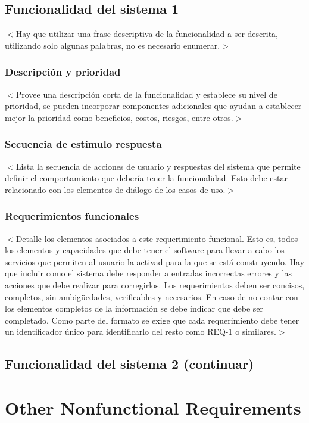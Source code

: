 \documentclass{scrreprt}
\begin{document}
\section{Funcionalidad del sistema 1}
$<$Hay que utilizar una frase descriptiva de la funcionalidad a ser descrita, utilizando solo algunas palabras, no es necesario enumerar.$>$

\subsection{Descripción y prioridad}
$<$Provee una descripción corta de la funcionalidad y establece su nivel de prioridad, se pueden incorporar componentes adicionales que ayudan a establecer mejor la prioridad como beneficios, costos, riesgos, entre otros.$>$

\subsection{Secuencia de estimulo respuesta}
$<$Lista la secuencia de acciones de usuario y respuestas del sistema que permite definir el comportamiento que debería tener la funcionalidad. Esto debe estar relacionado con los elementos de diálogo de los casos de uso.$>$

\subsection{Requerimientos funcionales}
$<$Detalle los elementos asociados a este requerimiento funcional. Esto es, todos los elementos y capacidades que debe tener el software para llevar a cabo los servicios que permiten al usuario la activad para la que se está construyendo. Hay que incluir como el sistema debe responder a entradas incorrectas errores y las acciones que debe realizar para corregirlos. Los requerimientos deben ser concisos, completos, sin ambigüedades, verificables y necesarios. En caso de no contar con los elementos completos de la información se debe indicar que debe ser completado. Como parte del formato se exige que cada requerimiento debe tener un identificador único para identificarlo del resto como REQ-1 o similares.$>$

\section{Funcionalidad del sistema 2 (continuar)}


\chapter{Other Nonfunctional Requirements}
\end{document}
